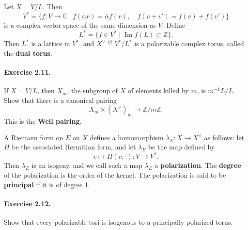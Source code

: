 

\DeclareMathOperator{\End}{End}     %
\DeclareMathOperator{\Image}{Im}    %


Let $X = V/L$. Then
\[
  V^* = \{ f \colon V \to \mathbb{C} \mid f(\alpha v) = \bar{\alpha} f(v),
    \quad f(v + v') = f(v) + f(v') \}
\]
is a complex vector space of the same dimension as $V$. Define
\[
  L^* = \{ f \in V^* \mid \Image f(L) \subset \mathbb{Z} \}.
\]
Then $L^*$ is a lattice in $V^*$, and
$X^{\vee} \overset{\text{df}}{=} V^*/L^*$ is a polarizable complex torus,
called the \textbf{dual torus}.

\paragraph{Exercise 2.11.}
If $X = V/L$, then $X_m$, the subgroup of $X$ of elements killed by $m$, is
$m^{-1}L/L$. Show that there is a canonical pairing
\[
  X_m \times (X^{\vee})_m \to \mathbb{Z}/m\mathbb{Z}.
\]
This is the \textbf{Weil pairing}.

A Riemann form on $E$ on $X$ defines a homomorphism
$\lambda_E \colon X \to X^{\vee}$ as follows: let $H$ be the associated
Hermitian form, and let $\lambda_E$ be the map defined by
\[
  v \mapsto H(v, \cdot) \colon V \to V^*.
\]
Then $\lambda_E$ is an isogeny, and we call such a map $\lambda_E$ a
\textbf{polarization}. The \textbf{degree} of the polarization is the order
of the kernel. The polarization is said to be \textbf{principal} if it is of
degree 1.

\paragraph{Exercise 2.12.}
Show that every polarizable tori is isogenous to a principally polarized
torus.

